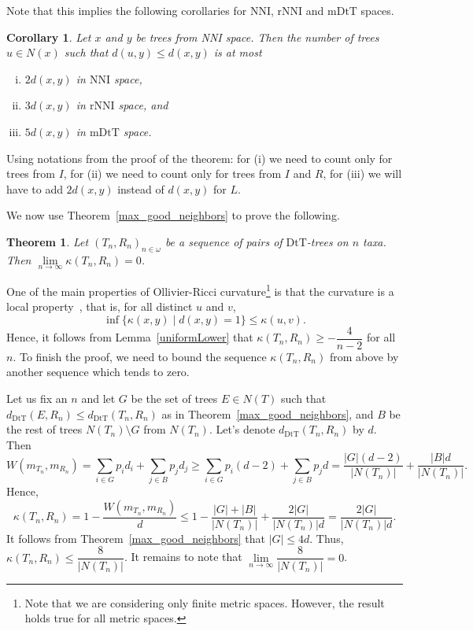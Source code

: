 \documentclass{amsart}
\newtheorem{corollary}[lemma]{Corollary}
\newtheorem{theorem}[lemma]{Theorem}
\newcommand{\dts}{\mathrm{DtT}}
\newcommand{\nni}{\mathrm{NNI}}
\newcommand{\rnni}{\mathrm{rNNI}}
\newcommand{\mdts}{\mathrm{mDtT}}
\begin{document}
Note that this implies the following corollaries for $\nni$, $\rnni$ and $\mdts$ spaces.
\begin{corollary}
Let $x$ and $y$ be trees from NNI space.
Then the number of trees $u \in N(x)$ such that $d(u, y) \le d(x, y)$ is at most
\begin{enumerate}[(i)]
\item $2d(x,y)$ in $\nni$ space,
\item $3d(x,y)$ in $\rnni$ space, and
\item $5d(x,y)$ in $\mdts$ space.
\end{enumerate}
\end{corollary}

\proof
Using notations from the proof of the theorem: for (i) we need to count only for trees from $I$, for (ii) we need to count only for trees from $I$ and $R$, for (iii) we will have to add $2d(x,y)$ instead of $d(x,y)$ for $L$.
\endproof

We now use Theorem~\ref{max_good_neighbors} to prove the following.

\begin{theorem}\label{zero-in-the-limit}
Let $(T_n,R_n)_{n\in\omega}$ be a sequence of pairs of $\dts$-trees on $n$ taxa.
Then $\lim\limits_{n \to \infty}\kappa(T_n,R_n) = 0$.
\end{theorem}

\proof
One of the main properties of Ollivier-Ricci curvature\footnote{Note that we are considering only finite metric spaces.
However, the result holds true for all metric spaces.}
is that the curvature is a local property~\cite{Ollivier2009-cj}, that is, for all distinct $u$ and $v$,
\[
\inf\{\kappa(x,y)\mid d(x,y) = 1\} \leq \kappa(u,v).
\]
Hence, it follows from Lemma~\ref{uniformLower} that $\kappa(T_n,R_n) \geq -\dfrac{4}{n-2}$ for all $n$.
To finish the proof, we need to bound the sequence $\kappa(T_n,R_n)$ from above by another sequence which tends to zero.

Let us fix an $n$ and let $G$ be the set of trees $E \in N(T)$ such that $d_\dts(E,R_n) \leq d_\dts(T_n,R_n)$ as in Theorem~\ref{max_good_neighbors}, and $B$ be the rest of trees $N(T_n)\setminus G$ from $N(T_n)$.
Let's denote $d_\dts(T_n,R_n)$ by $d$. Then
\[
W(m_{T_n},m_{R_n}) = \sum_{i\in G} p_i d_i + \sum_{j\in B} p_j d_j \geq
\sum_{i\in G} p_i (d-2) + \sum_{j\in B} p_j d =
\frac{|G|(d-2)}{|N(T_n)|} + \frac{|B|d}{|N(T_n)|}.
\]
Hence,
\[
\kappa(T_n,R_n) = 1 - \frac{W(m_{T_n},m_{R_n})}{d} \leq
1 - \frac{|G| + |B|}{|N(T_n)|} + \frac{2|G|}{|N(T_n)|d}
= \frac{2|G|}{|N(T_n)|d}.
\]
It follows from Theorem~\ref{max_good_neighbors} that $|G| \leq 4d$.
Thus, $\kappa(T_n,R_n) \leq \dfrac{8}{|N(T_n)|}$.
It remains to note that $\lim\limits_{n\to\infty}\dfrac{8}{|N(T_n)|} = 0$.
\endproof
\end{document}
